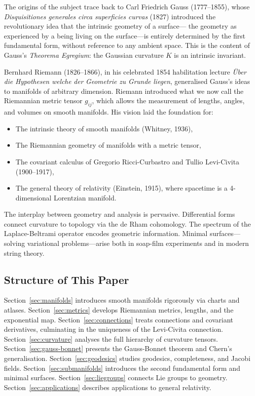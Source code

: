\documentclass[12pt,a4paper]{amsart}
\theoremstyle{definition}
\begin{document}
The origins of the subject trace back to Carl Friedrich Gauss (1777--1855),
whose \emph{Disquisitiones generales circa superficies curvas} (1827)
introduced the revolutionary idea that the intrinsic geometry of a surface---
the geometry as experienced by a being living on the surface---is entirely
determined by the first fundamental form, without reference to any ambient
space. This is the content of Gauss's \emph{Theorema Egregium}: the Gaussian
curvature $K$ is an intrinsic invariant.

Bernhard Riemann (1826--1866), in his celebrated 1854 habilitation lecture
\emph{\"Uber die Hypothesen welche der Geometrie zu Grunde liegen}, generalised
Gauss's ideas to manifolds of arbitrary dimension. Riemann introduced what we
now call the Riemannian metric tensor $g_{ij}$, which allows the measurement
of lengths, angles, and volumes on smooth manifolds. His vision laid the
foundation for:
\begin{itemize}
  \item The intrinsic theory of smooth manifolds (Whitney, 1936),
  \item The Riemannian geometry of manifolds with a metric tensor,
  \item The covariant calculus of Gregorio Ricci-Curbastro and Tullio
        Levi-Civita (1900--1917),
  \item The general theory of relativity (Einstein, 1915), where spacetime
        is a 4-dimensional Lorentzian manifold.
\end{itemize}

The interplay between geometry and analysis is pervasive. Differential forms
connect curvature to topology via the de Rham cohomology. The spectrum of the
Laplace-Beltrami operator encodes geometric information. Minimal surfaces---
solving variational problems---arise both in soap-film experiments and in
modern string theory.

\subsection{Structure of This Paper}

Section~\ref{sec:manifolds} introduces smooth manifolds rigorously via charts
and atlases. Section~\ref{sec:metrics} develops Riemannian metrics, lengths,
and the exponential map. Section~\ref{sec:connections} treats connections and
covariant derivatives, culminating in the uniqueness of the Levi-Civita
connection. Section~\ref{sec:curvature} analyses the full hierarchy of
curvature tensors. Section~\ref{sec:gauss-bonnet} presents the Gauss-Bonnet
theorem and Chern's generalisation. Section~\ref{sec:geodesics} studies
geodesics, completeness, and Jacobi fields. Section~\ref{sec:submanifolds}
introduces the second fundamental form and minimal surfaces.
Section~\ref{sec:liegroups} connects Lie groups to geometry. Section~\ref{sec:applications}
describes applications to general relativity.
\end{document}
